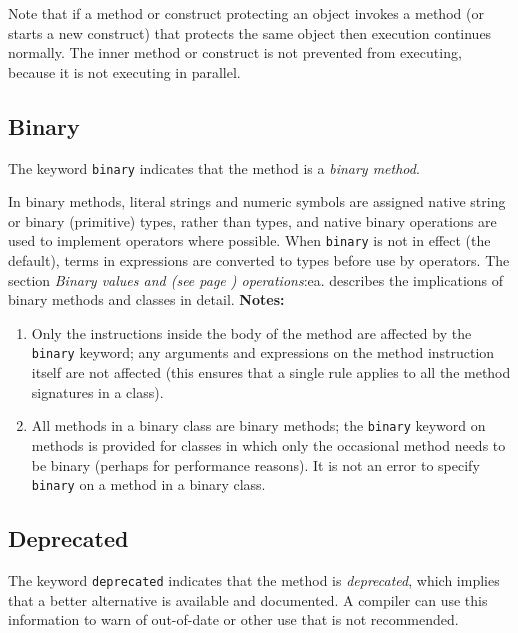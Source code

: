 Note that if a method or construct protecting an object invokes a method
(or starts a new construct) that protects the same object then execution
continues normally.  The inner method or construct is not prevented from
executing, because it is not executing in parallel.
\subsection{Binary}\label{refbinme}
 
The keyword \texttt{binary} indicates that the method is a \emph{binary
method}.
 
In binary methods, literal strings and numeric symbols are assigned
native string or binary (primitive) types, rather than \nr{} types,
and native binary operations are used to implement operators where
possible.
When \texttt{binary} is not in effect (the default), terms in
expressions are converted to \nr{} types before use by operators.
The section  \emph{Binary values and (see page \pageref{refbinary}) 
operations}:ea. describes the implications of binary methods and
classes in detail.
 \textbf{Notes:}
\begin{enumerate}
\item 
Only the instructions inside the body of the method are affected by the
\texttt{binary} keyword; any arguments and expressions on the method
instruction itself are not affected (this ensures that a single rule
applies to all the method signatures in a class).
\item 
All methods in a binary class are binary methods; the \texttt{binary}
keyword on methods is provided for classes in which only the occasional
method needs to be binary (perhaps for performance reasons).
It is not an error to specify \texttt{binary} on a method in a binary
class.
\end{enumerate}
\subsection{Deprecated}\label{refdepme}
 
The keyword \texttt{deprecated} indicates that the method
is \emph{deprecated}, which implies that a better alternative is
available and documented.  A compiler can use this information to warn
of out-of-date or other use that is not recommended.
 

